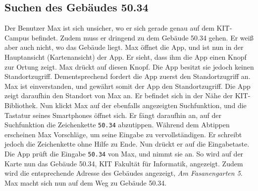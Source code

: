 \subsection{Suchen des Gebäudes 50.34}

Der Benutzer Max ist sich unsicher, wo er sich gerade genau auf dem KIT-Campus befindet.
Zudem muss er dringend zu dem Gebäude 50.34 gehen.
Er weiß aber auch nicht, wo das Gebäude liegt.
Max öffnet die App, und ist nun in der Hauptansicht (Kartenansicht) der App.
Er sieht, dass ihm die App einen Knopf zur Ortung zeigt.
Max drückt auf diesen Knopf.
Die App besitzt sie jedoch keinen Standortzugriff.
Dementsprechend fordert die App zuerst den Standortzugriff an.
Max ist einverstanden, und gewährt somit der App den Standortzugriff.
Die App zeigt daraufhin den Standort von Max an.
Er befindet sich in der Nähe der KIT-Bibliothek.
Nun klickt Max auf der ebenfalls angezeigten Suchfunktion, und die Tastatur seines Smartphones öffnet sich.
Er fängt daraufhin an, auf der Suchfunktion die Zeichenkette \texttt{50.34} abzutippen. 
Während dem Abtippen erscheinen Max Vorschläge, um seine Eingabe zu vervollständigen. 
Er schreibt jedoch die Zeichenkette ohne Hilfe zu Ende. 
Nun drückt er auf die Eingabetaste. 
Die App prüft die Eingabe \texttt{50.34} von Max, und nimmt sie an. 
So wird auf der Karte nun das Gebäude 50.34, KIT Fakultät für Informatik, angezeigt. 
Zudem wird die entsprechende Adresse des Gebäudes angezeigt, \textit{Am Fasanengarten 5}. 
Max macht sich nun auf dem Weg zu Gebäude 50.34.